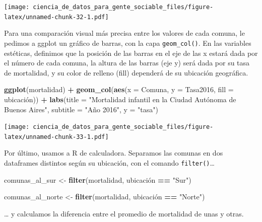 \documentclass[]{book}
\newenvironment{Shaded}{\begin{snugshade}}{\end{snugshade}}
\newcommand{\KeywordTok}[1]{\textcolor[rgb]{0.13,0.29,0.53}{\textbf{#1}}}
\newcommand{\DataTypeTok}[1]{\textcolor[rgb]{0.13,0.29,0.53}{#1}}
\newcommand{\StringTok}[1]{\textcolor[rgb]{0.31,0.60,0.02}{#1}}
\newcommand{\OperatorTok}[1]{\textcolor[rgb]{0.81,0.36,0.00}{\textbf{#1}}}
\newcommand{\NormalTok}[1]{#1}
\begin{document}
\texttt{[image: ciencia\_de\_datos\_para\_gente\_sociable\_files/figure-latex/unnamed-chunk-32-1.pdf]}

Para una comparación visual más precisa entre los valores de cada
comuna, le pedimos a ggplot un gráfico de barras, con la capa
\texttt{geom\_col()}. En las variables estéticas, definimos que la
posición de las barras en el eje de las x estará dada por el número de
cada comuna, la altura de las barras (eje y) será dada por su tasa de
mortalidad, y su color de relleno (fill) dependerá de su ubicación
geográfica.

\begin{Shaded}
\begin{Highlighting}[]
\KeywordTok{ggplot}\NormalTok{(mortalidad) }\OperatorTok{+}
\StringTok{    }\KeywordTok{geom_col}\NormalTok{(}\KeywordTok{aes}\NormalTok{(}\DataTypeTok{x =}\NormalTok{ Comuna, }\DataTypeTok{y =}\NormalTok{ Tasa2016, }\DataTypeTok{fill =}\NormalTok{ ubicación)) }\OperatorTok{+}
\StringTok{    }\KeywordTok{labs}\NormalTok{(}\DataTypeTok{title =} \StringTok{"Mortalidad infantil en la Ciudad Autónoma de Buenos Aires"}\NormalTok{,}
         \DataTypeTok{subtitle =} \StringTok{"Año 2016"}\NormalTok{,}
         \DataTypeTok{y =} \StringTok{"tasa"}\NormalTok{) }
\end{Highlighting}
\end{Shaded}

\texttt{[image: ciencia\_de\_datos\_para\_gente\_sociable\_files/figure-latex/unnamed-chunk-33-1.pdf]}

Por último, usamos a R de calculadora. Separamos las comunas en dos
dataframes distintos según su ubicación, con el comando
\texttt{filter()}\ldots{}

\begin{Shaded}
\begin{Highlighting}[]
\NormalTok{comunas_al_sur <-}\StringTok{ }\KeywordTok{filter}\NormalTok{(mortalidad, ubicación }\OperatorTok{==}\StringTok{ "Sur"}\NormalTok{)}

\NormalTok{comunas_al_norte <-}\StringTok{ }\KeywordTok{filter}\NormalTok{(mortalidad, ubicación }\OperatorTok{==}\StringTok{ "Norte"}\NormalTok{)}
\end{Highlighting}
\end{Shaded}

\ldots{} y calculamos la diferencia entre el promedio de mortalidad de
unas y otras.

\begin{Shaded}
\end{Shaded}
\end{document}
